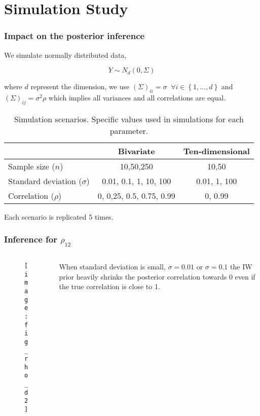 \documentclass[9pt]{beamer}\usepackage[]{graphicx}\usepackage[]{color}
\begin{document}
\section{Simulation Study}
\begin{frame}
\frametitle{Impact on the posterior inference}

We simulate normally distributed data, 

\[Y \sim N_d(0, \Sigma)\] 

where $d$ represent the dimension, we use $(\Sigma)_{ii} =\sigma \;\; \forall i \in \left\{1,\ldots,d\right\} $ and $(\Sigma)_{ij} = \sigma^2\rho$ which implies all variances and all correlations are equal.

\begin{table}[htbp]
   \caption{Simulation scenarios. Specific values used in simulations for each parameter. \label{scen}} 
   \vspace{-.4cm}
     \begin{tabular}{lcc} \hline
          &  Bivariate    & Ten-dimensional  \\ \hline
      Sample size   ($n$)   & 10,50,250   &  10,50  \\
      Standard deviation ($\sigma$)  & 0.01, 0.1, 1, 10, 100 & 0.01, 1, 100 \\
      Correlation ($\rho$)   &  0, 0,25, 0.5, 0.75, 0.99  &  0, 0.99 \\ \hline
   \end{tabular}
\end{table}
Each scenario is replicated 5 times. 

\end{frame}

\begin{frame}
\frametitle{Inference for $\rho_{12}$}
	\begin{columns}
	 \begin{column}{7cm}
		 \begin{figure}[hbtp]
		   \texttt{[image: fig\_rho\_d2]} 
		\end{figure}
	\end{column}
	\begin{column}{4cm}
	When standard deviation is small, $\sigma=0.01$ or $\sigma=0.1$ the IW prior heavily shrinks the posterior correlation towards 0 even if the true correlation is close to 1. 
	\end{column}
	\end{columns}
\end{frame}
\end{document}
